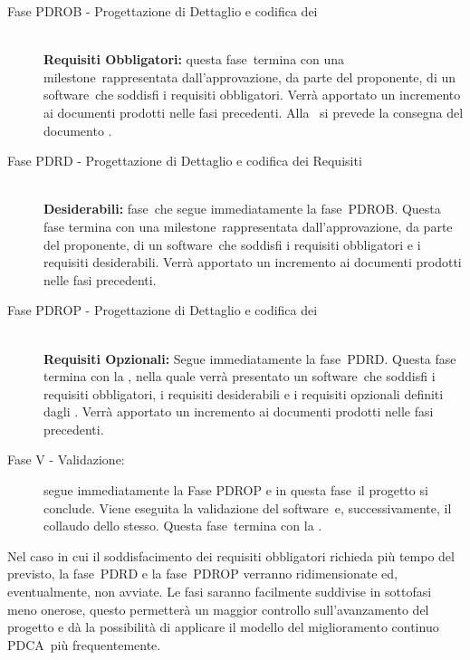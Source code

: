 \documentclass[../PianoProgetto.tex]{subfiles}
\begin{document}
\begin{description}
	\item[Fase PDROB - Progettazione di Dettaglio e codifica dei] \ \\
		\textbf{ Requisiti Obbligatori:}
		questa fase\g\ termina con una milestone\g\ rappresentata dall'approvazione, da parte del proponente, di un software\g\ che soddisfi i requisiti obbligatori.
		Verrà apportato un incremento ai documenti prodotti nelle fasi precedenti.
		Alla \revisionediprogettazione\ si prevede la consegna del documento  .
  
  
	\item[Fase PDRD - Progettazione di Dettaglio e codifica dei Requisiti] \ \\
		\textbf{Desiderabili:}
		fase\g\ che segue immediatamente la fase\g\ 
PDROB. Questa fase termina con una milestone\g\ rappresentata dall'approvazione, da parte del proponente, di un software\g\ che soddisfi i requisiti obbligatori e i requisiti desiderabili.
		Verrà apportato un incremento ai documenti prodotti nelle fasi precedenti.


	\item[Fase PDROP - Progettazione di Dettaglio e codifica dei ] \ \\
		\textbf{Requisiti Opzionali:}
		Segue immediatamente la fase\g\ PDRD. Questa fase termina con la \revisionediqualifica , nella quale verrà presentato un software\g\ che soddisfi i requisiti obbligatori, i requisiti desiderabili e i requisiti opzionali definiti dagli \analisti.
		Verrà apportato un incremento ai documenti prodotti nelle fasi precedenti.


	\item[Fase V - Validazione:]
	segue immediatamente la Fase PDROP e in questa fase\g\ il progetto si conclude. Viene eseguita la validazione del software\g\ e, successivamente, il collaudo dello stesso.
		Questa fase\g\ termina con la \revisionediaccettazione . 
		
	\end{description}
	
		Nel caso in cui il soddisfacimento dei requisiti obbligatori richieda più tempo del previsto, la fase\g\ PDRD e la fase\g\ 
PDROP verranno ridimensionate ed, eventualmente, non avviate.
		Le fasi saranno facilmente suddivise in sottofasi meno onerose, questo permetterà un maggior controllo sull'avanzamento del progetto e dà la possibilità di applicare il modello del miglioramento continuo PDCA\g\ più frequentemente.
\end{document}
